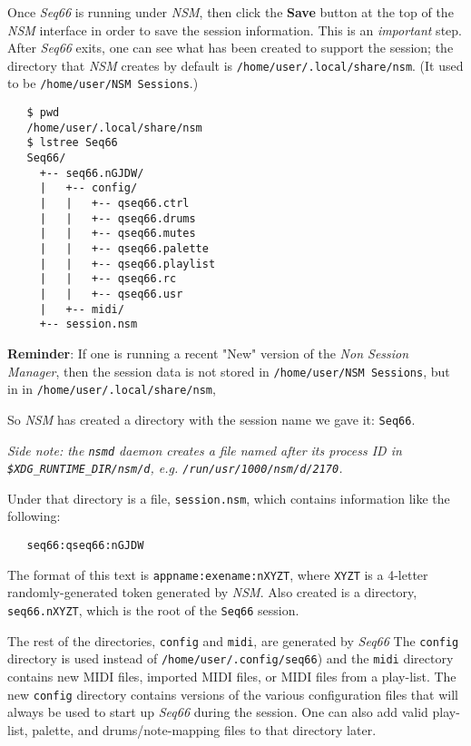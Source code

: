    Once \textsl{Seq66} is running under \textsl{NSM},
   then click the \textbf{Save}
   button at the top of the \textsl{NSM} interface in order
   to save the session information.
   This is an \textsl{important} step.
   After \textsl{Seq66} exits,
   one can see what has been created to support the session;
   the directory that \textsl{NSM}
   creates by default is \texttt{/home/user/.local/share/nsm}.
   (It used to be \texttt{/home/user/NSM Sessions}.)

\begin{verbatim}
   $ pwd
   /home/user/.local/share/nsm
   $ lstree Seq66
   Seq66/
     +-- seq66.nGJDW/
     |   +-- config/
     |   |   +-- qseq66.ctrl
     |   |   +-- qseq66.drums
     |   |   +-- qseq66.mutes
     |   |   +-- qseq66.palette
     |   |   +-- qseq66.playlist
     |   |   +-- qseq66.rc
     |   |   +-- qseq66.usr
     |   +-- midi/
     +-- session.nsm
\end{verbatim}

   \textbf{Reminder}: If one is running a recent "New" version of the 
   \textsl{Non Session Manager}, then the session data is not stored
   in \texttt{/home/user/NSM Sessions},
   but in
   in \texttt{/home/user/.local/share/nsm},

   So \textsl{NSM} has created a directory with the session name we gave it:
   \texttt{Seq66}.

   \textsl{Side note: the \texttt{nsmd} daemon creates a file named after its
   process ID in \texttt{\$XDG\_RUNTIME\_DIR/nsm/d}, e.g.
   \texttt{/run/usr/1000/nsm/d/2170}.}

   Under that directory is a file, \texttt{session.nsm}, which
   contains information like the following:

\begin{verbatim}
   seq66:qseq66:nGJDW
\end{verbatim}

   The format of this text is \texttt{appname:exename:nXYZT}, where
   \texttt{XYZT} is a 4-letter randomly-generated token
   generated by \textsl{NSM}.
   Also created is a directory, \texttt{seq66.nXYZT}, which is the root of the
   \texttt{Seq66} session.

   The rest of the directories,
   \texttt{config} and \texttt{midi},
   are generated by \textsl{Seq66}
   The \texttt{config} directory is used instead of
   \texttt{/home/user/.config/seq66}) and the \texttt{midi} directory
   contains new MIDI files, imported MIDI files,
   or MIDI files from a play-list.
   The new \texttt{config} directory
   contains versions of the various configuration files that will always be
   used to start up \textsl{Seq66} during the session.
   One can also add valid play-list, palette, and drums/note-mapping files to
   that directory later.

